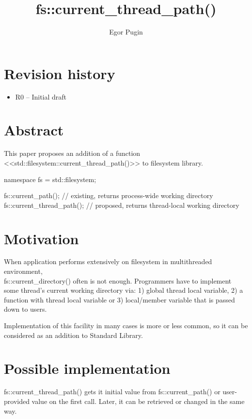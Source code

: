 \documentclass{wg21}
\title{fs::current\_thread\_path()}
\author{Egor Pugin}{egor.pugin@gmail.com}
\begin{document}
\maketitle

\section{Revision history}
\begin{itemize}
  \item R0 -- Initial draft
\end{itemize}


\section{Abstract}
This paper proposes an addition of a function <<std::filesystem::current_thread_path()>> to filesystem library.

\begin{cpp}
namespace fs = std::filesystem;

fs::current_path();        // existing, returns process-wide working directory
fs::current_thread_path(); // proposed, returns thread-local working directory
\end{cpp}


\section{Motivation}
When application performs extensively on filesystem in multithreaded environment,\\ fs::current_directory() often is not enough.
Programmers have to implement some thread's current working directory via: 1) global thread local variable, 2) a function with thread local variable or 3) local/member variable that is passed down to users.

Implementation of this facility in many cases is more or less common, so it can be considered as an addition to Standard Library.



\section{Possible implementation}


fs::current_thread_path() gets it initial value from fs::current_path() or user-provided value on the first call.
Later, it can be retrieved or changed in the same way.
\end{document}
